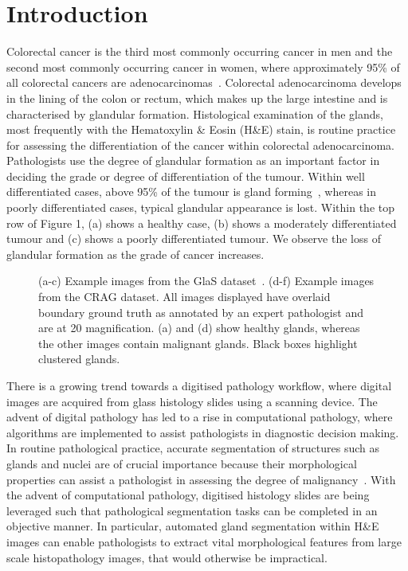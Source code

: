\documentclass[3p]{elsarticle}
\begin{document}
\section{Introduction}
Colorectal cancer is the third most commonly occurring cancer in men and the second most commonly occurring cancer in women, where approximately 95\% of all colorectal cancers are adenocarcinomas~\citep{fleming2012colorectal}. Colorectal adenocarcinoma develops in the lining of the colon or rectum, which makes up the large intestine and is characterised by glandular formation. Histological examination of the glands, most frequently with the Hematoxylin \& Eosin (H\&E) stain, is routine practice for assessing the differentiation of the cancer within colorectal adenocarcinoma. Pathologists use the degree of glandular formation as an important factor in deciding the grade or degree of differentiation of the tumour. Within well differentiated cases, above 95\% of the tumour is gland forming~\citep{fleming2012colorectal}, whereas in poorly differentiated cases, typical glandular appearance is lost. Within the top row of Figure 1, (a) shows a healthy case, (b) shows a moderately differentiated tumour and (c) shows a poorly differentiated tumour. We observe the loss of glandular formation as the grade of cancer increases. 



\begin{figure}[!t]
\captionsetup[subfigure]{labelformat=empty}
\centering
{}
\caption{(a-c) Example images from the GlaS dataset~\citep{sirinukunwattana2017gland}. (d-f) Example images from the CRAG dataset. All images displayed have overlaid boundary ground truth as annotated by an expert pathologist and are at 20 magnification. (a) and (d) show healthy glands, whereas the other images contain malignant glands. Black boxes highlight clustered glands.
}
\label{fig:detection}
\end{figure}

There is a growing trend towards a digitised pathology workflow, where digital images are acquired from glass histology slides using a scanning device. The advent of digital pathology has led to a rise in computational pathology, where algorithms are implemented to assist pathologists in diagnostic decision making. In routine pathological practice, accurate segmentation of structures such as glands and nuclei are of crucial importance because their morphological properties can assist a pathologist in assessing the degree of malignancy~\citep{compton2000updated,hamilton2000pathology,washington2009protocol}. With the advent of computational pathology, digitised histology slides are being leveraged such that pathological segmentation tasks can be completed in an objective manner. In particular, automated gland segmentation within H\&E images can enable pathologists to extract vital morphological features from large scale histopathology images, that would otherwise be impractical.
\end{document}
